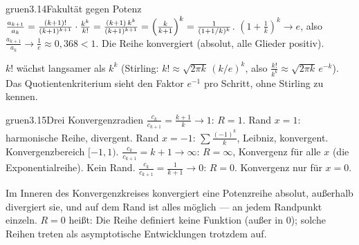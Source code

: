 \begin{loesungkarte}{gruen}{3.14}{Fakultät gegen Potenz}
$\frac{a_{k+1}}{a_k} = \frac{(k + 1)!}{(k + 1)^{k+1}}\cdot\frac{k^{k}}{k!} = \frac{(k + 1)\,k^{k}}{(k + 1)^{k+1}} = \Bigl(\frac k{k + 1}\Bigr)^{k} = \frac1{(1 + 1/k)^{k}}$.
$(1 + \frac1k)^{k}\to e$, also $\frac{a_{k+1}}{a_k}\to\frac1e\approx0{,}368 < 1$. Die Reihe konvergiert (absolut, alle Glieder positiv).
\begin{mitnehmen}\kastentext
$k!$ wächst langsamer als $k^{k}$ (Stirling: $k!\approx\sqrt{2\pi k}\,(k/e)^{k}$, also $\frac{k!}{k^{k}}\approx\sqrt{2\pi k}\,e^{-k}$). Das Quotientenkriterium sieht den Faktor $e^{-1}$ pro Schritt, ohne Stirling zu kennen.
\end{mitnehmen}
\end{loesungkarte}

\begin{loesungkarte}{gruen}{3.15}{Drei Konvergenzradien}
$\frac{c_k}{c_{k+1}} = \frac{k + 1}k\to1$: $R = 1$. Rand $x = 1$: harmonische Reihe, divergent. Rand $x = -1$: $\sum\frac{(-1)^{k}}k$, Leibniz, konvergent. Konvergenzbereich $[-1, 1)$.
$\frac{c_k}{c_{k+1}} = k + 1\to\infty$: $R = \infty$, Konvergenz für alle $x$ (die Exponentialreihe). Kein Rand.
$\frac{c_k}{c_{k+1}} = \frac1{k + 1}\to0$: $R = 0$. Konvergenz nur für $x = 0$.
\begin{mitnehmen}\kastentext
Im Inneren des Konvergenzkreises konvergiert eine Potenzreihe absolut, außerhalb divergiert sie, und auf dem Rand ist alles möglich --- an jedem Randpunkt einzeln. $R = 0$ heißt: Die Reihe definiert keine Funktion (außer in $0$); solche Reihen treten als asymptotische Entwicklungen trotzdem auf.
\end{mitnehmen}
\end{loesungkarte}

